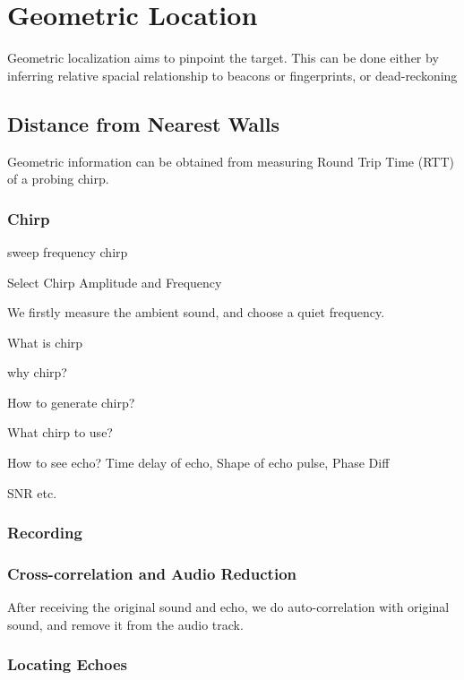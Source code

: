 \section{Geometric Location}
\label{sec:geo}

Geometric localization aims to pinpoint the target. This can be done either by 
inferring relative spacial relationship to beacons or fingerprints, or dead-reckoning


\subsection{Distance from Nearest Walls}

Geometric information can be obtained from measuring Round Trip Time (RTT)
of a probing chirp. 

\subsubsection{Chirp}


sweep frequency chirp


Select Chirp Amplitude and Frequency

We firstly measure the ambient sound, and choose a quiet frequency.


What is chirp


why chirp?


How to generate chirp?


What chirp to use?


How to see echo? Time delay of echo, Shape of echo pulse, Phase Diff


SNR etc.


\subsubsection{Recording}

\subsubsection{Cross-correlation and Audio Reduction}

After receiving the original sound and echo, we do auto-correlation with original sound,
and remove it from the audio track.



\subsubsection{Locating Echoes}

